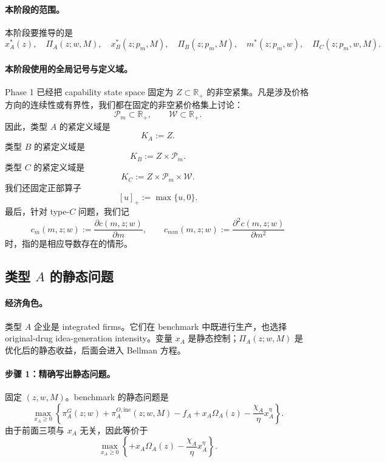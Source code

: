 \paragraph{本阶段的范围。}
本阶段要推导的是
\[
x_A^*(z),\quad \Pi_A(z;w,M),\quad
x_B^*(z;p_m,M),\quad \Pi_B(z;p_m,M),\quad
m^*(z;p_m,w),\quad \Pi_C(z;p_m,w,M).
\]

\paragraph{本阶段使用的全局记号与定义域。}
Phase 1 已经把 capability state space 固定为 $Z\subset \mathbb R_+$ 的非空紧集。凡是涉及价格方向的连续性或有界性，我们都在固定的非空紧价格集上讨论：
\[
\mathcal P_m\subset\mathbb R_+,\qquad \mathcal W\subset\mathbb R_+.
\]
因此，类型 $A$ 的紧定义域是
\[
K_A:=Z.
\]
类型 $B$ 的紧定义域是
\[
K_B:=Z\times \mathcal P_m.
\]
类型 $C$ 的紧定义域是
\[
K_C:=Z\times \mathcal P_m\times \mathcal W.
\]
我们还固定正部算子
\[
[u]_+:=\max\{u,0\}.
\]
最后，针对 type-$C$ 问题，我们记
\[
c_m(m,z;w):=\frac{\partial c(m,z;w)}{\partial m},
\qquad
c_{mm}(m,z;w):=\frac{\partial^2 c(m,z;w)}{\partial m^2}
\]
时，指的是相应导数存在的情形。

\subsection{类型 $A$ 的静态问题}

\paragraph{经济角色。}
类型 $A$ 企业是 integrated firms。它们在 benchmark 中既进行生产，也选择 original-drug idea-generation intensity。变量 $x_A$ 是静态控制；$\Pi_A(z;w,M)$ 是优化后的静态收益，后面会进入 Bellman 方程。

\paragraph{步骤 1：精确写出静态问题。}
固定 $(z,w,M)$。benchmark 的静态问题是
\begin{equation}
\max_{x_A\ge 0}
\left\{
\pi_A^G(z;w)+\pi_A^{O,\mathrm{inc}}(z;w,M)-f_A
+x_A\Omega_A(z)-\frac{\chi_A}{\eta}x_A^\eta
\right\}.
\label{eq:p2A_problem}
\end{equation}
由于前面三项与 $x_A$ 无关，因此等价于
\begin{equation}
\max_{x_A\ge 0}
\left\{
+x_A\Omega_A(z)-\frac{\chi_A}{\eta}x_A^\eta
\right\}.
\label{eq:p2A_problem_reduced}
\end{equation}


